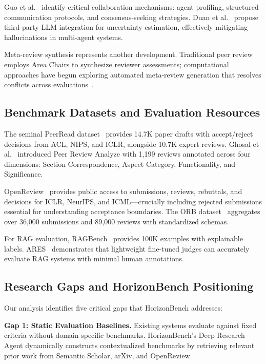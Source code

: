Guo et al.~\cite{guo2024survey} identify critical collaboration mechanisms: agent profiling, structured communication protocols, and consensus-seeking strategies. Duan et al.~\cite{duan2024consensus} propose third-party LLM integration for uncertainty estimation, effectively mitigating hallucinations in multi-agent systems.

Meta-review synthesis represents another development. Traditional peer review employs Area Chairs to synthesize reviewer assessments; computational approaches have begun exploring automated meta-review generation that resolves conflicts across evaluations~\cite{li2023meta}.

\subsection{Benchmark Datasets and Evaluation Resources}

The seminal PeerRead dataset~\cite{kang2018peerread} provides 14.7K paper drafts with accept/reject decisions from ACL, NIPS, and ICLR, alongside 10.7K expert reviews. Ghosal et al.~\cite{ghosal2022peer} introduced Peer Review Analyze with 1,199 reviews annotated across four dimensions: Section Correspondence, Aspect Category, Functionality, and Significance.

OpenReview~\cite{openreview} provides public access to submissions, reviews, rebuttals, and decisions for ICLR, NeurIPS, and ICML---crucially including rejected submissions essential for understanding acceptance boundaries. The ORB dataset~\cite{orb2023} aggregates over 36,000 submissions and 89,000 reviews with standardized schemas.

For RAG evaluation, RAGBench~\cite{ragbench2024} provides 100K examples with explainable labels. ARES~\cite{ares2024} demonstrates that lightweight fine-tuned judges can accurately evaluate RAG systems with minimal human annotations.

\subsection{Research Gaps and HorizonBench Positioning}

Our analysis identifies five critical gaps that HorizonBench addresses:

\textbf{Gap 1: Static Evaluation Baselines.} Existing systems evaluate against fixed criteria without domain-specific benchmarks. HorizonBench's Deep Research Agent dynamically constructs contextualized benchmarks by retrieving relevant prior work from Semantic Scholar, arXiv, and OpenReview.


